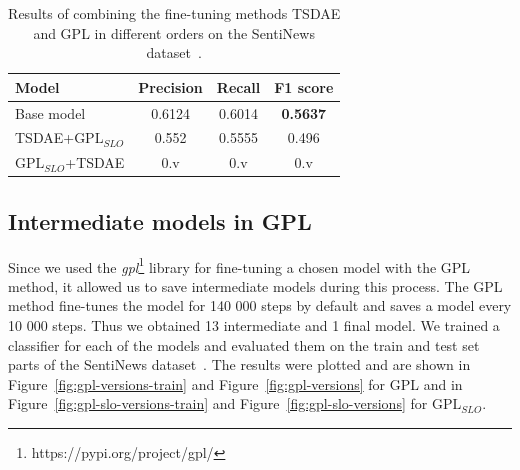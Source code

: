 \documentclass[fleqn,moreauthors,10pt]{ds_report}
\begin{document}
\begin{table}[!h]
	\footnotesize
	\begin{center}
		\begin{tabular}{ |l|c|c|c| }
		\hline
		\rowcolor{Blue}Model & Precision & Recall & F1 score\\
		\hline

		Base model & 0.6124 & 0.6014 & \textbf{0.5637}\\
		TSDAE+$\text{GPL}_{SLO}$ & 0.552 & 0.5555 & 0.496\\
		$\text{GPL}_{SLO}$+TSDAE &  0.v & 0.v & 0.v\\

		\hline
		\end{tabular}
	\end{center}
\caption{Results of combining the fine-tuning methods TSDAE and GPL in different orders on the SentiNews dataset~\cite{sentiNews}.}
\label{tab3}
\end{table}



\subsection*{Intermediate models in GPL}
\label{intermediate-paraphrase}
Since we used the \textit{gpl}\footnote{https://pypi.org/project/gpl/} library for fine-tuning a chosen model with the GPL method, it allowed us to save intermediate models during this process. The GPL method fine-tunes the model for 140 000 steps by default and saves a model every 10 000 steps. Thus we obtained 13 intermediate and 1 final model. We trained a classifier for each of the models and evaluated them on the train and test set parts of the SentiNews dataset~\cite{sentiNews}. The results were plotted and are shown in Figure~\ref{fig:gpl-versions-train} and Figure~\ref{fig:gpl-versions} for GPL and in Figure~\ref{fig:gpl-slo-versions-train} and Figure~\ref{fig:gpl-slo-versions} for $\text{GPL}_{SLO}$.
\end{document}
